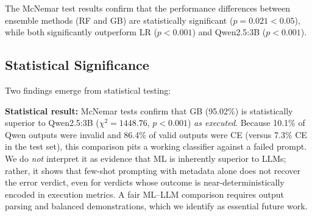 \documentclass[acmsmall]{acmart}
\begin{document}
The McNemar test results confirm that the performance differences between
ensemble methods (RF and GB) are statistically significant
($p = 0.021 < 0.05$), while both significantly outperform LR ($p < 0.001$)
and Qwen2.5:3B ($p < 0.001$).

\subsection{Statistical Significance}

\begin{table}[htbp]
\centering
\caption{McNemar test results (test set $n=2{,}672$)}
\label{tab:mcnemar}
%
\end{table}

Two findings emerge from statistical testing:

\textbf{Statistical result:} McNemar tests confirm that GB (95.02\%) is
statistically superior to Qwen2.5:3B ($\chi^2 = 1448.76$, $p < 0.001$)
\emph{as executed}. Because 10.1\% of Qwen outputs were invalid and
86.4\% of valid outputs were CE (versus 7.3\% CE in the test set), this
comparison pits a working classifier against a failed prompt. We do \emph{not}
interpret it as evidence that ML is inherently superior to LLMs; rather, it
shows that few-shot prompting with metadata alone does not recover the error
verdict, even for verdicts whose outcome is near-deterministically encoded in
execution metrics. A fair ML--LLM comparison requires output parsing and
balanced demonstrations, which we identify as essential future work.
\end{document}
